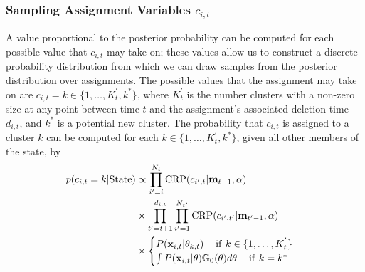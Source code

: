 \documentclass[smallcondensed, final]{svjour3}
\begin{document}

\subsubsection{Sampling Assignment Variables $c_{i,t}$}
\label{sec:sample_assignments}

A value proportional to the posterior probability can be computed for each possible value that $c_{i,t}$ may take on; these values allow us to construct a discrete probability distribution from which we can draw samples from the posterior distribution over assignments. The possible values that the assignment may take on are $c_{i,t} = k \in \{ 1 , \ldots ,  K_{t}^{'}, k^{*}\}$, where $K_{t}^{'}$ is the number clusters with a non-zero size at any point between time $t$ and the assignment's associated deletion time $d_{i,t}$, and $k^{*}$ is a potential new cluster. The probability that $c_{i,t}$ is assigned to a cluster $k$ can be computed for each $k \in \{ 1 , \ldots ,  K_{t}^{'}, k^{*} \}$, given all other members of the state, by
\begin{equation}
\label{mcmc_assig_vars}
\begin{split}
p(c_{i,t} = k | \text{State}) & \propto
\prod_{i'=i}^{N_{t}}  \text{CRP}(c_{i',t} | \bold{m}_{t-1}, \alpha) \\
& \times \prod_{t' = t+1}^{d_{i,t}}  \prod_{i'=1}^{N_{t'}}   \text{CRP}(c_{i',t'} | \bold{m}_{t'-1}, \alpha) \\
 & \times
\begin{cases}
	P(\bold{x}_{i,t} | \theta_{k,t})                                        \hspace{12pt} \text{if} \hspace{4pt} k \in \{ 1, \ldots, K_{t}^{'} \} \\
	\int P(\bold{x}_{i,t} | \theta) \mathbb{G}_{0}(\theta) d\theta    \hspace{12pt} \text{if}  \hspace{4pt}  k = k^{*}
\end{cases}
\end{split}
\end{equation}
\end{document}
